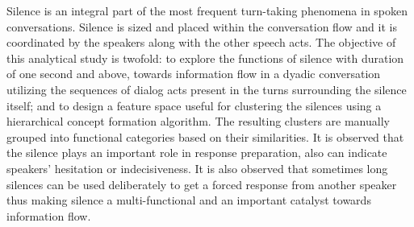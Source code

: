 Silence is an integral part of the most frequent turn-taking phenomena in spoken conversations.  Silence is sized and placed within the conversation flow and it is coordinated by the speakers along with the other speech acts. The objective of this analytical study is twofold: to explore the functions of silence with duration of one second and above, towards information flow in a dyadic conversation utilizing the sequences of dialog acts present in the turns surrounding the silence itself; and to design a feature space useful for clustering the silences using a hierarchical concept formation algorithm. The resulting clusters are manually grouped into functional categories based on their similarities. It is observed that the silence plays an important role in response preparation, also can indicate speakers' hesitation or indecisiveness. It is also observed that sometimes long silences can be used deliberately to get a forced response from another speaker thus making silence a multi-functional and an important catalyst towards information flow.
